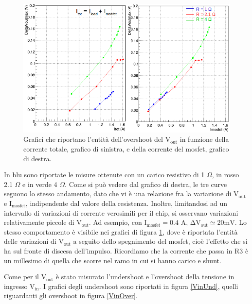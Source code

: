 \begin{figure}
\centering
\includegraphics[width=0.9\linewidth]{Immagini/VoutOver}
\caption{Grafici che riportano l'entità dell'overshoot del $\mathrm{V_{out}}$ in funzione della corrente totale, grafico di sinistra, e della corrente del mosfet, grafico di destra.}
\label{VoutOver}
\end{figure}
In blu sono riportate le misure ottenute con un carico resistivo di 1 $\Omega$, in rosso 2.1 $\Omega$ e in verde 4 $\Omega$.
Come si può vedere dal grafico di destra, le tre curve seguono lo stesso andamento, dato che vi è una relazione fra la variazione di $\mathrm{V_{out}}$ e $\mathrm{I_{mosfet}}$, indipendente dal valore della resistenza.
Inoltre, limitandosi ad un intervallo di variazioni di corrente verosimili per il chip, si osservano variazioni relativamente piccole di $\mathrm{V_{out}}$.
Ad esempio, con $\mathrm{I_{mosfet}= 0.4 }$ A, $\mathrm{\Delta V_{out} \simeq 20mV}$.
Lo stesso comportamento è visibile nei grafici di figura \ref{VoutOver}, dove è riportata l'entità delle variazioni di $\mathrm{V_{out}}$ a seguito dello spegnimento del mosfet, cioè l'effetto che si ha sul fronte di discesa dell'impulso. 
Ricordiamo che la corrente che passa in R3 è un millesimo di quella che scorre nel ramo in cui si hanno carico e shunt.

Come per il $\mathrm{V_{out}}$ è stato misurato l'undershoot e l'overshoot della tensione in ingresso $\mathrm{V_{in}}$. I grafici degli undershoot sono riportati in figura \ref{VinUnd}, quelli riguardanti gli overshoot in figura \ref{VinOver}. 


